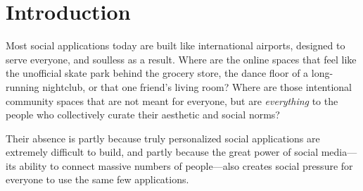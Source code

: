 \section{Introduction}

Most social applications today are built like international airports,
designed to serve everyone, and soulless as a result.
Where are the online spaces that feel like
the unofficial skate park behind the grocery store,
the dance floor of a long-running nightclub,
or that one friend's living room?
Where are those intentional community spaces that
are not meant for everyone,
but are \emph{everything} to the people
who collectively curate their aesthetic and social norms?

Their absence is partly because truly personalized social applications
are extremely difficult to build,
and partly because the great power of social media---its
ability to connect massive numbers of people---also
creates social pressure for everyone to use the same few applications.





